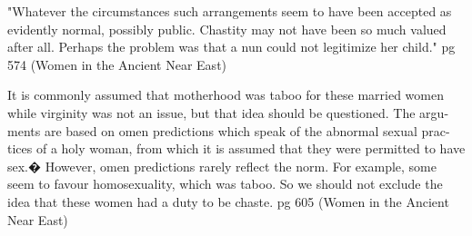 \documentclass[11pt]{article}
\begin{document}
"Whatever the circumstances such arrangements seem to have been accepted as evidently normal, possibly public. Chastity may not have been so much valued after all. Perhaps the problem was that a nun could not legitimize her child." pg 574 (Women in the Ancient Near East)



It is commonly assumed that motherhood was taboo for these married women
while virginity was not an issue, but that idea should be questioned. The argu-
ments are based on omen predictions which speak of the abnormal sexual prac-
tices of a holy woman, from which it is assumed that they were permitted to have
sex.� However, omen predictions rarely reflect the norm. For example, some
seem to favour homosexuality, which was taboo. So we should not exclude the
idea that these women had a duty to be chaste.
pg 605 (Women in the Ancient Near East)
\end{document}
